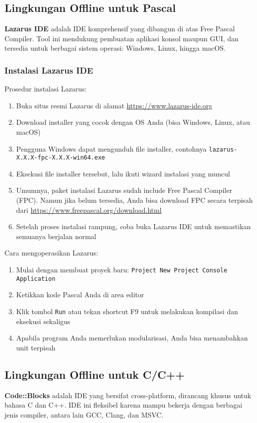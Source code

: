 \documentclass[../main.tex]{subfiles}
\begin{document}
\subsection{Lingkungan Offline untuk Pascal}
\textbf{Lazarus IDE} \parencite{lazarus} adalah IDE komprehensif yang dibangun di atas Free Pascal Compiler. Tool ini mendukung pembuatan aplikasi konsol maupun GUI, dan tersedia untuk berbagai sistem operasi: Windows, Linux, hingga macOS.

\subsubsection{Instalasi Lazarus IDE}
Prosedur instalasi Lazarus:
\begin{enumerate}
  \item Buka situs resmi Lazarus di alamat \url{https://www.lazarus-ide.org}
  \item Download installer yang cocok dengan OS Anda (bisa Windows, Linux, atau macOS)
  \item Pengguna Windows dapat mengunduh file installer, contohnya \texttt{lazarus-}\\\texttt{X.X.X-fpc-X.X.X-win64.exe}
  \item Eksekusi file installer tersebut, lalu ikuti wizard instalasi yang muncul
  \item Umumnya, paket instalasi Lazarus sudah include Free Pascal Compiler (FPC). Namun jika belum tersedia, Anda bisa download FPC secara terpisah dari \url{https://www.freepascal.org/download.html}
  \item Setelah proses instalasi rampung, coba buka Lazarus IDE untuk memastikan semuanya berjalan normal
\end{enumerate}

Cara mengoperasikan Lazarus:
\begin{enumerate}
  \item Mulai dengan membuat proyek baru: \texttt{Project \textrightarrow{} New Project \textrightarrow{} Console Application}
  \item Ketikkan kode Pascal Anda di area editor
  \item Klik tombol \texttt{Run} atau tekan shortcut F9 untuk melakukan kompilasi dan eksekusi sekaligus
  \item Apabila program Anda memerlukan modularisasi, Anda bisa menambahkan unit terpisah
\end{enumerate}

\subsection{Lingkungan Offline untuk C/C++}
\textbf{Code::Blocks} \parencite{codeblocks} adalah IDE yang bersifat cross-platform, dirancang khusus untuk bahasa C dan C++. IDE ini fleksibel karena mampu bekerja dengan berbagai jenis compiler, antara lain GCC, Clang, dan MSVC.
\end{document}
